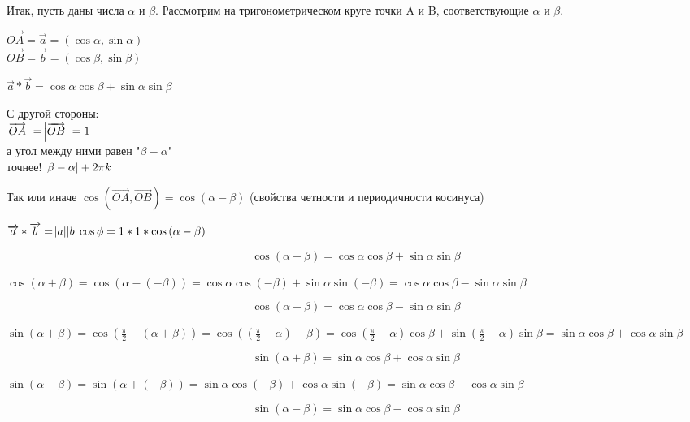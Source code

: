 \documentclass{article}
\begin{document}
        Итак, пусть даны числа \(\alpha\) и \(\beta\). Рассмотрим на тригонометрическом круге точки A и B, соответствующие \(\alpha\) и \(\beta\).
        
        \(\overrightarrow{OA} = \overrightarrow{a} = (\cos{\alpha}, \sin{\alpha})\) 
        \\\(\overrightarrow{OB} = \overrightarrow{b} = (\cos{\beta}, \sin{\beta})\)
        
        \(\overrightarrow{a}*\overrightarrow{b} = \cos{\alpha}\cos{\beta} + \sin{\alpha}\sin{\beta}\)
        
        С другой стороны:
        \\ \(\abs{\overrightarrow{OA}} = \abs{\overrightarrow{OB}} = 1\)
        \\а угол между ними равен "\(\beta - \alpha\)"
        \\точнее! \(\abs{\beta - \alpha} + 2 \pi k\)
        
        Так или иначе \(\cos{(\overrightarrow{OA}, \overrightarrow{OB})} = \cos{(\alpha - \beta)}\) (свойства четности и периодичности косинуса)
        
        \(\overrightarrow{a} * \overrightarrow{b} = \abs{a} \abs{b} \cos{\phi} = 1*1*\cos{(\alpha - \beta)}\)
        
        \textbf{\[\cos{(\alpha - \beta)} = \cos{\alpha}\cos{\beta} + \sin{\alpha}\sin{\beta}\]}
        
        \(\cos{(\alpha + \beta)} = \cos{(\alpha - (-\beta))} = \cos{\alpha}\cos{(-\beta)} + \sin{\alpha}\sin{(-\beta)} = \cos{\alpha}\cos{\beta} - \sin{\alpha}\sin{\beta}\)
        
        \textbf{\[\cos{(\alpha + \beta)} = \cos{\alpha}\cos{\beta} - \sin{\alpha}\sin{\beta}\]}
        
        \(\sin{(\alpha + \beta)} = \cos{(\frac{\pi}{2} - (\alpha + \beta))} = \cos{((\frac{\pi}{2} - \alpha) - \beta)} = \cos{(\frac{\pi}{2} - \alpha)}\cos{\beta} + \sin{(\frac{\pi}{2} - \alpha)}\sin{\beta} = \sin{\alpha}\cos{\beta} + \cos{\alpha}\sin{\beta}\)
        
        \textbf{\[\sin{(\alpha + \beta)} = \sin{\alpha}\cos{\beta} + \cos{\alpha}\sin{\beta}\]}
        
        \(\sin{(\alpha - \beta)} = \sin{(\alpha + (-\beta))} = \sin{\alpha}\cos{(-\beta)} + \cos{\alpha}\sin{(-\beta)} = \sin{\alpha}\cos{\beta} - \cos{\alpha}\sin{\beta}\)
        
        \textbf{\[\sin{(\alpha - \beta)} = \sin{\alpha}\cos{\beta} - \cos{\alpha}\sin{\beta}\]}
        
\end{document}
